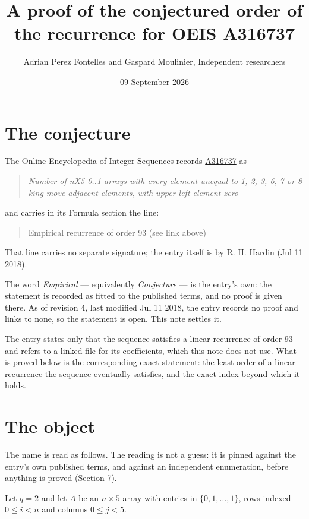 \documentclass[11pt]{article}
\title{A proof of the conjectured order of the recurrence for OEIS A316737}
\author{Adrian Perez Fontelles and Gaspard Moulinier, Independent researchers}
\date{09 September 2026}
\theoremstyle{definition}
\begin{document}
\maketitle
\section{The conjecture}

The Online Encyclopedia of Integer Sequences records \href{https://oeis.org/A316737}{A316737} as

\begin{quote}\itshape Number of nX5 0..1 arrays with every element unequal to 1, 2, 3, 6, 7 or 8 king-move adjacent elements, with upper left element zero\end{quote}

and carries in its Formula section the line:

\begin{quote}\ttfamily Empirical recurrence of order 93 (see link above)\end{quote}

That line carries no separate signature; the entry itself is by R. H. Hardin (Jul 11 2018).

The word {\itshape Empirical} --- equivalently {\itshape Conjecture} --- is the entry's own: the statement is recorded as fitted to the published terms, and no proof is given there. As of revision 4, last modified Jul 11 2018, the entry records no proof and links to none, so the statement is open. This note settles it.

The entry states only that the sequence satisfies a linear recurrence of order $93$ and refers to a linked file for its coefficients, which this note does not use. What is proved below is the corresponding exact statement: the least order of a linear recurrence the sequence eventually satisfies, and the exact index beyond which it holds.

\section{The object}

The name is read as follows. The reading is not a guess: it is pinned against the entry's own published terms, and against an independent enumeration, before anything is proved (Section 7).

Let $q = 2$ and let $A$ be an $n \times 5$ array with entries in $\{0,1,\dots,1\}$, rows indexed $0 \le i < n$ and columns $0 \le j < 5$.
\end{document}
